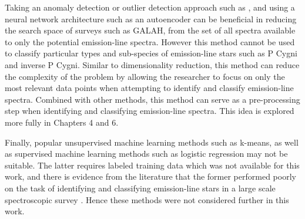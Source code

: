 Taking an anomaly detection or outlier detection approach such as \citet{vcotar2021galah}, and using a neural network architecture such as an autoencoder can be beneficial in reducing the search space of surveys such as GALAH, from the set of all spectra available to only the potential emission-line spectra. However this method cannot be used to classify particular types and sub-species of emission-line stars such as P Cygni and inverse P Cygni. Similar to dimensionality reduction, this method can reduce the complexity of the problem by allowing the researcher to focus on only the most relevant data points when attempting to identify and classify emission-line spectra. Combined with other methods, this method can serve as a pre-processing step when identifying and classifying emission-line spectra. This idea is explored more fully in Chapters 4 and 6. 

Finally, popular unsupervised machine learning methods such as k-means, as well as supervised machine learning methods such as logistic regression may not be suitable. The latter requires labeled training data which was not available for this work, and there is evidence from the literature that the former performed poorly on the task of identifying and classifying emission-line stars in a large scale spectroscopic survey \citep{garcia2018machine}. Hence these methods were not considered further in this work.


